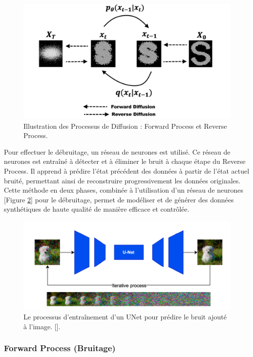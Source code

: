 \begin{figure}[hbt!]
	\centering
	\includegraphics[width=12cm]{images_pfe/diffusion_process.png}
	\caption{Illustration des Processus de Diffusion : Forward Process et Reverse Process.}
	\label{fig:pro_diff}
\end{figure}
\FloatBarrier

Pour effectuer le débruitage, un réseau de neurones est utilisé. Ce réseau de
neurones est entraîné à détecter et à éliminer le bruit à chaque étape du
Reverse Process. Il apprend à prédire l'état précédent des données à partir de
l'état actuel bruité, permettant ainsi de reconstruire progressivement les
données originales. Cette méthode en deux phases, combinée à l'utilisation d'un
réseau de neurones [Figure \ref{fig:unet_}] pour le débruitage, permet de
modéliser et de générer des données synthétiques de haute qualité de manière
efficace et contrôlée.

\begin{figure}[hbt!]
	\centering
	\includegraphics[width=12cm]{images_pfe/Unet.png}
	\caption{ Le processus d'entraînement d'un UNet pour prédire le bruit ajouté à l'image. [\cite{nichol2021improved}].}
	\label{fig:unet_}
\end{figure}
\FloatBarrier

\subsubsection{Forward Process (Bruitage)}

